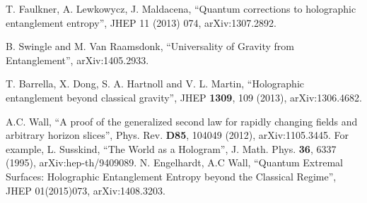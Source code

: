 \documentclass{article}
\begin{document}
\begin{thebibliography}{99}
T. Faulkner, A. Lewkowycz, J. Maldacena, ``Quantum corrections to holographic entanglement entropy'', JHEP 11 (2013) 074, arXiv:1307.2892.

B. Swingle and M. Van Raamsdonk, ``Universality of Gravity from Entanglement'', arXiv:1405.2933.

T. Barrella, X. Dong, S. A. Hartnoll and V. L. Martin, ``Holographic entanglement beyond classical gravity'', JHEP \textbf{1309}, 109 (2013), arXiv:1306.4682.

A.C. Wall, ``A proof of the generalized second law for rapidly changing fields and arbitrary horizon slices'', Phys. Rev. \textbf{D85}, 104049 (2012), arXiv:1105.3445.
For example, L. Susskind, ``The World as a Hologram'', J. Math. Phys. \textbf{36}, 6337 (1995), arXiv:hep-th/9409089.
N. Engelhardt, A.C Wall, ``Quantum Extremal Surfaces: Holographic Entanglement Entropy beyond the Classical Regime'', JHEP 01(2015)073, arXiv:1408.3203.

\end{thebibliography}
\end{document}
